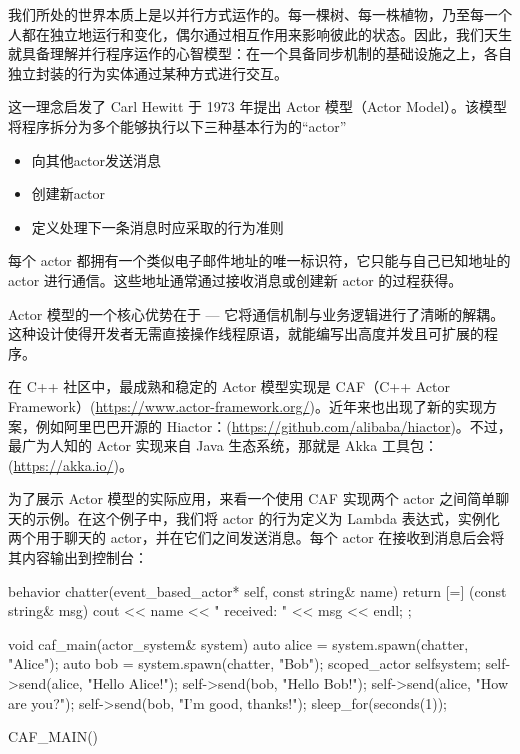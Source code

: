 
我们所处的世界本质上是以并行方式运作的。每一棵树、每一株植物，乃至每一个人都在独立地运行和变化，偶尔通过相互作用来影响彼此的状态。因此，我们天生就具备理解并行程序运作的心智模型：在一个具备同步机制的基础设施之上，各自独立封装的行为实体通过某种方式进行交互。

这一理念启发了 Carl Hewitt 于 1973 年提出 Actor 模型（Actor Model）。该模型将程序拆分为多个能够执行以下三种基本行为的“actor”

\begin{itemize}
\item 
向其他actor发送消息

\item 
创建新actor

\item 
定义处理下一条消息时应采取的行为准则
\end{itemize}

每个 actor 都拥有一个类似电子邮件地址的唯一标识符，它只能与自己已知地址的 actor 进行通信。这些地址通常通过接收消息或创建新 actor 的过程获得。

Actor 模型的一个核心优势在于 --- 它将通信机制与业务逻辑进行了清晰的解耦。这种设计使得开发者无需直接操作线程原语，就能编写出高度并发且可扩展的程序。

在 C++ 社区中，最成熟和稳定的 Actor 模型实现是 CAF（C++ Actor Framework）(\url{https://www.actor-framework.org/})。近年来也出现了新的实现方案，例如阿里巴巴开源的 Hiactor：(\url{https://github.com/alibaba/hiactor})。不过，最广为人知的 Actor 实现来自 Java 生态系统，那就是 Akka 工具包：(\url{https://akka.io/})。

为了展示 Actor 模型的实际应用，来看一个使用 CAF 实现两个 actor 之间简单聊天的示例。在这个例子中，我们将 actor 的行为定义为 Lambda 表达式，实例化两个用于聊天的 actor，并在它们之间发送消息。每个 actor 在接收到消息后会将其内容输出到控制台：

\begin{cpp}
behavior chatter(event_based_actor* self, const string& name) {
  return {
    [=] (const string& msg) {
      cout << name << " received: " << msg << endl;
    }
  };
}

void caf_main(actor_system& system) {
  auto alice = system.spawn(chatter, "Alice");
  auto bob = system.spawn(chatter, "Bob");
  scoped_actor self{system};
  self->send(alice, "Hello Alice!");
  self->send(bob, "Hello Bob!");
  self->send(alice, "How are you?");
  self->send(bob, "I'm good, thanks!");
  sleep_for(seconds(1));
}

CAF_MAIN()
\end{cpp}


